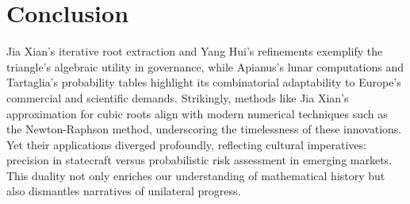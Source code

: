 \documentclass{article}
\begin{document}
\section{Conclusion}

Jia Xian’s iterative root extraction and Yang Hui’s refinements exemplify the triangle’s algebraic utility in governance, while Apianus’s lunar computations and Tartaglia’s probability tables highlight its combinatorial adaptability to Europe’s commercial and scientific demands. Strikingly, methods like Jia Xian’s approximation for cubic roots align with modern numerical techniques such as the Newton-Raphson method, underscoring the timelessness of these innovations. Yet their applications diverged profoundly, reflecting cultural imperatives: precision in statecraft versus probabilistic risk assessment in emerging markets. This duality not only enriches our understanding of mathematical history but also dismantles narratives of unilateral progress.

\newpage


\end{document}
